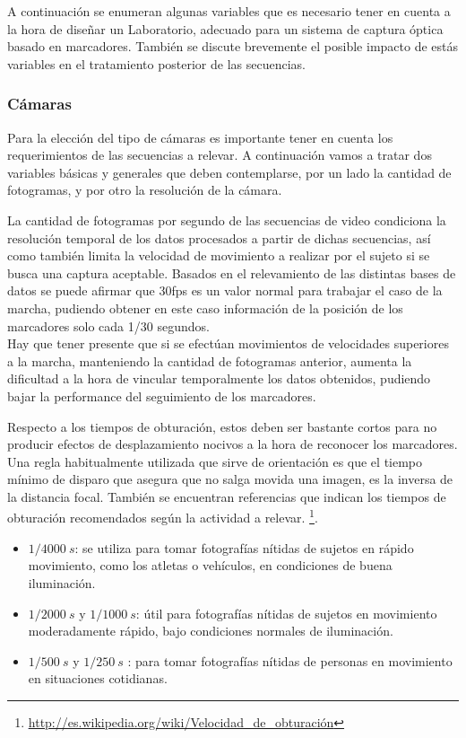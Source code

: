 A continuación se enumeran algunas variables que es necesario tener en cuenta a la hora de diseñar un Laboratorio, adecuado para un sistema de captura óptica basado en marcadores. También se discute brevemente el posible impacto de estás variables en el tratamiento posterior de las secuencias.

\subsubsection{Cámaras}\label{parrafo_Camaras} 
Para la elección del tipo de cámaras es importante tener en cuenta los requerimientos de las secuencias a relevar. A continuación vamos a tratar dos variables básicas y generales que deben contemplarse, por un lado la cantidad de fotogramas, y por otro la resolución de la cámara.

La cantidad de fotogramas por segundo de las secuencias de video condiciona la resolución temporal de los datos procesados a partir de dichas secuencias, así como también limita la velocidad de movimiento a realizar por el sujeto si se busca una captura aceptable.
Basados en el relevamiento de las distintas bases de datos se puede afirmar que 30fps es un valor normal para trabajar el caso de la marcha, pudiendo obtener en este caso información de la posición de los marcadores solo cada 1/30 segundos.\\ 
Hay que tener presente que si se efectúan movimientos de velocidades superiores a la marcha, manteniendo la cantidad de fotogramas anterior, aumenta la dificultad a la hora de vincular temporalmente los datos obtenidos, pudiendo bajar la performance del seguimiento de los marcadores. 

Respecto a los tiempos de obturación, estos deben ser bastante cortos  para no producir efectos de desplazamiento nocivos a la hora de reconocer los marcadores.
Una regla habitualmente utilizada que sirve de orientación es que el tiempo mínimo de disparo que asegura que no salga movida una imagen, es la inversa de la distancia focal. También se encuentran referencias que indican los tiempos de obturación recomendados según la actividad a relevar. \footnote{\textcolor{blue}{\underline{\url{http://es.wikipedia.org/wiki/Velocidad_de_obturación}}}}.
\begin{itemize}
\item $1 / 4000~ s$:  se utiliza para tomar fotografías nítidas de sujetos en rápido movimiento, como los atletas o vehículos, en condiciones de buena iluminación.
\item $1 / 2000 ~s$ y $1/ 1000~s$: útil  para fotografías nítidas de sujetos en movimiento moderadamente rápido, bajo condiciones normales de iluminación.
\item $1 / 500~s$ y $1/ 250~s$ :  para tomar fotografías nítidas de personas en movimiento en situaciones cotidianas.
\end{itemize}
 
